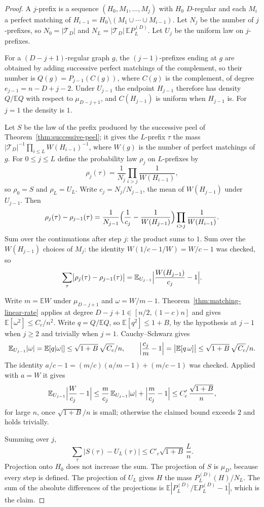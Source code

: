 \documentclass[11pt]{article}
\newcommand{\EE}{\mathbb{E}}
\begin{document}
\begin{proof}
A \(j\)-prefix is a sequence \((H_0,M_1,\ldots,M_j)\) with \(H_0\)
\(D\)-regular and each \(M_i\) a perfect matching of
\(H_{i-1}=H_0\setminus(M_1\cup\cdots\cup M_{i-1})\).
Let \(N_j\) be the number of \(j\)-prefixes, so \(N_0=|\mathcal T_D|\) and
\(N_L=|\mathcal T_D|\,\EE P_L^{(D)}\).
Let \(U_j\) be the uniform law on \(j\)-prefixes.

For a \((D-j+1)\)-regular graph \(g\), the \((j-1)\)-prefixes ending at \(g\)
are obtained by adding successive perfect matchings of the complement, so their
number is \(Q(g)=P_{j-1}(C(g))\), where \(C(g)\) is the complement, of degree
\(e_{j-1}=n-D+j-2\).
Under \(U_{j-1}\) the endpoint \(H_{j-1}\) therefore has density
\(Q/\EE Q\) with respect to \(\mu_{D-j+1}\), and \(C(H_{j-1})\) is uniform
when \(H_{j-1}\) is.
For \(j=1\) the density is \(1\).

Let \(S\) be the law of the prefix produced by the successive peel of
Theorem~\ref{thm:successive-peel}; it gives the \(L\)-prefix \(\tau\) the mass
\(|\mathcal T_D|^{-1}\prod_{i\le L}W(H_{i-1})^{-1}\), where \(W(g)\) is the
number of perfect matchings of \(g\).
For \(0\le j\le L\) define the probability law \(\rho_j\) on \(L\)-prefixes by
\[
\rho_j(\tau)
=
\frac1{N_j}\prod_{i>j}\frac1{W(H_{i-1})},
\]
so \(\rho_0=S\) and \(\rho_L=U_L\).
Write \(c_j=N_j/N_{j-1}\), the mean of \(W(H_{j-1})\) under \(U_{j-1}\).
Then
\[
\rho_j(\tau)-\rho_{j-1}(\tau)
=
\frac1{N_{j-1}}
\Bigl(\frac1{c_j}-\frac1{W(H_{j-1})}\Bigr)
\prod_{i>j}\frac1{W(H_{i-1})}.
\]
Sum over the continuations after step \(j\): the product sums to \(1\).
Sum over the \(W(H_{j-1})\) choices of \(M_j\): the identity
\(W(1/c-1/W)=W/c-1\) was checked, so
\[
\sum_\tau\bigl|\rho_j(\tau)-\rho_{j-1}(\tau)\bigr|
=
\EE_{U_{j-1}}\Bigl|\frac{W(H_{j-1})}{c_j}-1\Bigr|.
\]

Write \(m=\EE W\) under \(\mu_{D-j+1}\) and \(\omega=W/m-1\).
Theorem~\ref{thm:matching-linear-rate} applies at degree \(D-j+1\in[n/2,(1-c)n]\)
and gives \(\EE[\omega^2]\le C_c/n^2\).
Write \(q=Q/\EE Q\), so \(\EE[q^2]\le 1+B\), by the hypothesis at
\(j-1\) when \(j\ge 2\) and trivially when \(j=1\).
Cauchy--Schwarz gives
\[
\EE_{U_{j-1}}|\omega|=\EE[q|\omega|]\le\sqrt{1+B}\,\sqrt{C_c}/n,
\qquad
\Bigl|\frac{c_j}{m}-1\Bigr|=\bigl|\EE[q\,\omega]\bigr|\le\sqrt{1+B}\,\sqrt{C_c}/n.
\]
The identity \(a/c-1=(m/c)(a/m-1)+(m/c-1)\) was checked.
Applied with \(a=W\) it gives
\[
\EE_{U_{j-1}}\Bigl|\frac{W}{c_j}-1\Bigr|
\le
\frac{m}{c_j}\,\EE_{U_{j-1}}|\omega|+\Bigl|\frac{m}{c_j}-1\Bigr|
\le
C'_c\,\frac{\sqrt{1+B}}{n},
\]
for large \(n\), once \(\sqrt{1+B}/n\) is small; otherwise the claimed bound
exceeds \(2\) and holds trivially.

Summing over \(j\),
\[
\sum_\tau\bigl|S(\tau)-U_L(\tau)\bigr|
\le
C'_c\sqrt{1+B}\,\frac{L}{n}.
\]
Projection onto \(H_0\) does not increase the sum.
The projection of \(S\) is \(\mu_D\), because every step is defined.
The projection of \(U_L\) gives \(H\) the mass \(P_L^{(D)}(H)/N_L\).
The sum of the absolute differences of the projections is
\(\EE|P_L^{(D)}/\EE P_L^{(D)}-1|\), which is the claim.
\end{proof}
\end{document}

